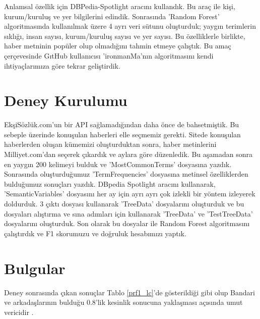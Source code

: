 \documentclass[conference]{IEEEtran}
\begin{document}
Anlamsal özellik için DBPedia-Spotlight \cite{isem2013daiber} aracını kullandık. Bu araç ile kişi, kurum/kuruluş ve yer bilgilerini edindik. Sonrasında 'Random Forest' \cite{random-forest} algoritmasında kullanılmak üzere 4 ayrı veri sütunu oluşturduk; yaygın terimlerin sıklığı, insan sayısı, kurum/kuruluş sayısı ve yer sayısı. Bu özelliklerle birlikte, haber metninin popüler olup olmadığını tahmin etmeye çalıştık. Bu amaç çerçevesinde GıtHub kullanıcısı 'ironmanMa'nın algoritmasını kendi ihtiyaçlarımıza göre tekrar geliştirdik.

\section{Deney Kurulumu}
EkşiSözlük.com'un bir API sağlamadığından daha önce de bahsetmiştik. Bu sebeple üzerinde konuşulan haberleri elle seçmemiz gerekti. Sitede konuşulan haberlerden oluşan kümemizi oluşturduktan sonra, haber metinlerini Milliyet.com'dan seçerek çıkardık ve aylara göre düzenledik. Bu aşamadan sonra en yaygın 200 kelimeyi bulduk ve 'MostCommonTerms' dosyasına yazdık. Sonrasında oluşturduğumuz 'TermFrequencies' dosyasına metinsel özelliklerden bulduğumuz sonuçları yazdık. DBpedia Spotlight aracını kullanarak, 'SemanticVariables' dosyasını her ay için ayrı ayrı çok izlekli bir yöntem izleyerek doldurduk. 3 çıktı dosyası kullanarak 'TreeData' dosyalarını oluşturduk ve bu dosyaları alıştırma ve sına adımları için kullanarak 'TreeData' ve 'TestTreeData' dosyalarını oluşturduk. Son olarak bu dosyalar ile Random Forest algoritmasını çalıştırdık ve F1 skorumuzu ve doğruluk hesabımızı yaptık.

\section{Bulgular}

Deney sonrasında çıkan sonuçlar Tablo \ref{prf1_lc}'de gösterildiği gibi olup Bandari ve arkadaşlarının bulduğu 0.8'lik kesinlik sonucuna yaklaşması açısında umut vericidir \cite{bandari_pulse_2012}.
\end{document}
